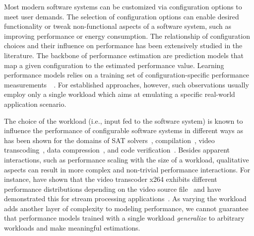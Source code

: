 
Most modern software systems can be customized via configuration options to meet user demands. The selection of configuration options can enable desired functionality or tweak non-functional aspects of a software system, such as improving performance or energy consumption. The relationship of configuration choices and their influence on performance has been extensively studied in the literature. The backbone of performance estimation are prediction models that map a given configuration to the estimated performance value. Learning performance models relies on a training set of configuration-specific performance measurements~~\cite{dorn2020,siegmundPerformanceinfluenceModelsHighly2015,haDeepPerf2019,perfAL,guoVariabilityawarePerformancePrediction2013,sarkarCostEfficientSamplingPerformance,guo_2018_data,fourier_learning_2015,perLasso}. For established approaches, however, such observations usually employ only a single workload which aims at emulating a specific real-world application scenario.

The choice of the workload (i.e., input fed to the software system) is known to influence the performance of configurable software systems in different ways as has been shown for the domains of SAT solvers~\cite{falkner_sat_solvers_2015,satzilla_2008}, compilation~\cite{ding_compilation_2015,plotnikov_compilation_2013}, video transcoding~\cite{maxiaguine_workload_2004,alves_sampling_2020}, data compression~\cite{khavari_compression_2019}, and code verification~\cite{koc_satune_2021}. Besides apparent interactions, such as performance scaling with the size of a workload, qualitative aspects can result in more complex and non-trivial performance interactions. For instance, \citeauthor{alves_sampling_2020} have shown that the video transcoder \textsf{x264} exhibits different performance distributions depending on the video source file~\cite{alves_sampling_2020} and \citeauthor{liao_2020_using_emse} have demonstrated this for stream processing applications~\cite{liao_2020_using_emse}. As varying the workload adds another layer of complexity to modeling performance, we cannot guarantee that performance models trained with a single workload \textit{generalize} to arbitrary workloads and make meaningful estimations. 

